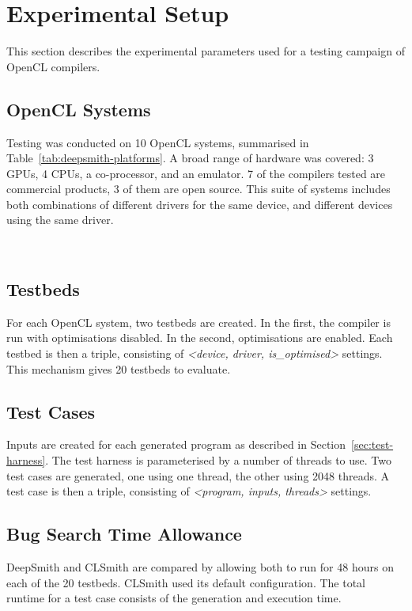 \section{Experimental Setup}
\label{sec:deepsmith-experimental-setup}

This section describes the experimental parameters used for a testing campaign of OpenCL compilers.

\subsection{OpenCL Systems}

Testing was conducted on 10 OpenCL systems, summarised in Table~\ref{tab:deepsmith-platforms}. A broad range of hardware was covered: 3 GPUs, 4 CPUs, a co-processor, and an emulator. 7 of the compilers tested are commercial products, 3 of them are open source. This suite of systems includes both combinations of different drivers for the same device, and different devices using the same driver.

\begin{table}
  \centering %
  \subfloat[][]{}%
  \\%
  \subfloat[][]{} %
  \caption[OpenCL systems and the number of bug reports submitted to date]{%
    OpenCL systems and the number of bug reports submitted to date (22\% of which have been fixed, the remainder are pending). For each system, two testbeds are created, one with compiler optimisations, the other without.%
  }
  \label{tab:deepsmith-platforms}
\end{table}

\subsection{Testbeds}

For each OpenCL system, two testbeds are created. In the first, the compiler is run with optimisations disabled. In the second, optimisations are enabled. Each testbed is then a triple, consisting of \emph{\textless device, driver, is\_optimised\textgreater} settings. This mechanism gives 20 testbeds to evaluate.


\subsection{Test Cases}

Inputs are created for each generated program as described in Section~\ref{sec:test-harness}. The test harness is parameterised by a number of threads to use. Two test cases are generated, one using one thread, the other using 2048 threads. A test case is then a triple, consisting of \emph{\textless program, inputs, threads\textgreater} settings.

\subsection{Bug Search Time Allowance}

DeepSmith and CLSmith are compared by allowing both to run for 48 hours on each of the 20 testbeds. CLSmith used its default configuration. The total runtime for a test case consists of the generation and execution time.
